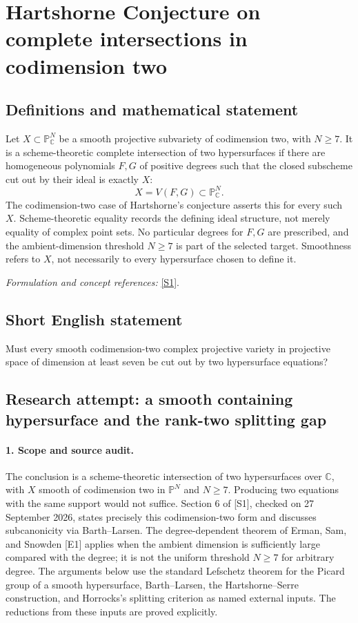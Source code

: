 \documentclass[11pt]{article}
\begin{document}
\section*{\texorpdfstring{Hartshorne Conjecture on complete intersections in codimension two}{Hartshorne Conjecture on complete intersections in codimension two}}\label{30006857}
\subsection{Definitions and mathematical statement}
Let $X\subset{\mathbb{P}}^N_{{\mathbb{C}}}$ be a smooth projective subvariety of codimension two, with $N\ge7$. It is a scheme-theoretic complete intersection of two hypersurfaces if there are homogeneous polynomials $F,G$ of positive degrees such that the closed subscheme cut out by their ideal is exactly $X$:
\[
 X=V(F,G)\subset{\mathbb{P}}^N_{{\mathbb{C}}}.
\]
The codimension-two case of Hartshorne's conjecture asserts this for every such $X$. Scheme-theoretic equality records the defining ideal structure, not merely equality of complex point sets. No particular degrees for $F,G$ are prescribed, and the ambient-dimension threshold $N\ge7$ is part of the selected target. Smoothness refers to $X$, not necessarily to every hypersurface chosen to define it.
\par\smallskip\textit{Formulation and concept references:} \href{https://link.springer.com/article/10.1007/s12215-024-01032-4}{[S1]}.

\subsection{Short English statement}
Must every smooth codimension-two complex projective variety in projective space of dimension at least seven be cut out by two hypersurface equations?
\subsection{Research attempt: a smooth containing hypersurface and the rank-two splitting gap}
\paragraph{1. Scope and source audit.}
The conclusion is a scheme-theoretic intersection of two hypersurfaces over $\mathbb C$, with $X$ smooth of codimension two in $\mathbb P^N$ and $N\geq7$. Producing two equations with the same support would not suffice. Section 6 of [S1], checked on 27 September 2026, states precisely this codimension-two form and discusses subcanonicity via Barth--Larsen. The degree-dependent theorem of Erman, Sam, and Snowden [E1] applies when the ambient dimension is sufficiently large compared with the degree; it is not the uniform threshold $N\geq7$ for arbitrary degree. The arguments below use the standard Lefschetz theorem for the Picard group of a smooth hypersurface, Barth--Larsen, the Hartshorne--Serre construction, and Horrocks's splitting criterion as named external inputs. The reductions from these inputs are proved explicitly.
\end{document}
